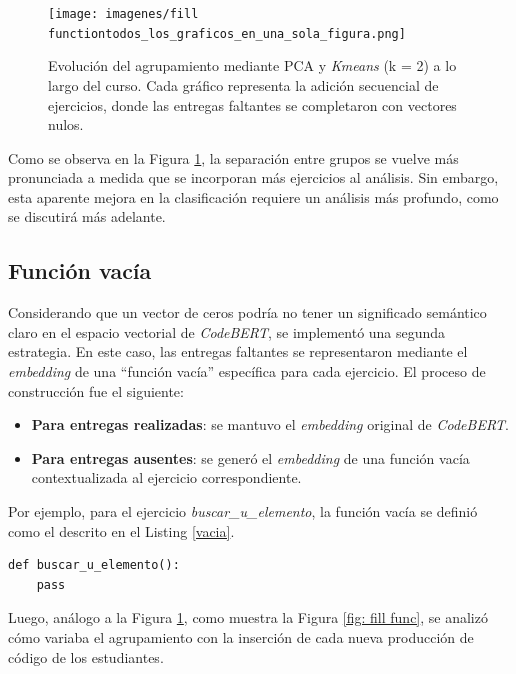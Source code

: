 \documentclass[11pt,a4paper,twoside,openany]{tesis}
\begin{document}
\begin{figure}[H]
    \centering
    \texttt{[image: imagenes/fill functiontodos\_los\_graficos\_en\_una\_sola\_figura.png]}
    \caption{Evolución del agrupamiento mediante PCA y \emph{Kmeans} (k = 2) a lo largo del curso. Cada gráfico representa la adición secuencial de ejercicios, donde las entregas faltantes se completaron con vectores nulos.}
    \label{fig: zeros}
\end{figure}

Como se observa en la Figura \ref{fig: zeros}, la separación entre grupos se vuelve más pronunciada a medida que se incorporan más ejercicios al análisis. Sin embargo, esta aparente mejora en la clasificación requiere un análisis más profundo, como se discutirá más adelante.

\subsection{Función vacía}

Considerando que un vector de ceros podría no tener un significado semántico claro en el espacio vectorial de \emph{CodeBERT}, se implementó una segunda estrategia. En este caso, las entregas faltantes se representaron mediante el \emph{embedding} de una ``función vacía'' específica para cada ejercicio. El proceso de construcción fue el siguiente:

\begin{itemize}
    \item \textbf{Para entregas realizadas}: se mantuvo el \emph{embedding} original de \emph{CodeBERT}.
    \item \textbf{Para entregas ausentes}: se generó el \emph{embedding} de una función vacía contextualizada al ejercicio correspondiente.
\end{itemize}

Por ejemplo, para el ejercicio \emph{buscar\_u\_elemento}, la función vacía se definió como el descrito en el Listing \ref{vacia}. 

\begin{lstlisting}[style=pythonstyle, label={vacia}, caption={Ejemplo de función vacía para un ejercicio del curso.}]
def buscar_u_elemento():
    pass
\end{lstlisting}

Luego, análogo a la Figura \ref{fig: zeros}, como muestra la Figura \ref{fig: fill func}, se analizó cómo variaba el agrupamiento con la inserción de cada nueva producción de código de los estudiantes.
\end{document}
